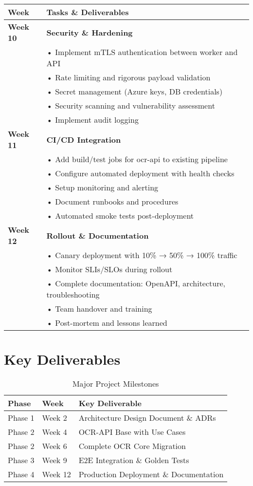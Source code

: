 \documentclass[11pt,a4paper]{article}
\begin{document}
\begin{longtable}{|p{2cm}|p{12cm}|}
\hline
\rowcolor{phase4!30}
\textbf{Week} & \textbf{Tasks \& Deliverables} \\
\hline
\endhead

\textbf{Week 10} & 
\textbf{Security \& Hardening} \\
& • Implement mTLS authentication between worker and API \\
& • Rate limiting and rigorous payload validation \\
& • Secret management (Azure keys, DB credentials) \\
& • Security scanning and vulnerability assessment \\
& • Implement audit logging \\
\hline

\textbf{Week 11} & 
\textbf{CI/CD Integration} \\
& • Add build/test jobs for ocr-api to existing pipeline \\
& • Configure automated deployment with health checks \\
& • Setup monitoring and alerting \\
& • Document runbooks and procedures \\
& • Automated smoke tests post-deployment \\
\hline

\textbf{Week 12} & 
\textbf{Rollout \& Documentation} \\
& • Canary deployment with 10\% → 50\% → 100\% traffic \\
& • Monitor SLIs/SLOs during rollout \\
& • Complete documentation: OpenAPI, architecture, troubleshooting \\
& • Team handover and training \\
& • Post-mortem and lessons learned \\
\hline
\end{longtable}

\section{Key Deliverables}

\begin{table}[h!]
\centering
\begin{tabular}{|l|l|l|}
\hline
\rowcolor{gray!30}
\textbf{Phase} & \textbf{Week} & \textbf{Key Deliverable} \\
\hline
Phase 1 & Week 2 & Architecture Design Document \& ADRs \\
\hline
Phase 2 & Week 4 & OCR-API Base with Use Cases \\
\hline
Phase 2 & Week 6 & Complete OCR Core Migration \\
\hline
Phase 3 & Week 9 & E2E Integration \& Golden Tests \\
\hline
Phase 4 & Week 12 & Production Deployment \& Documentation \\
\hline
\end{tabular}
\caption{Major Project Milestones}
\end{table}
\end{document}
